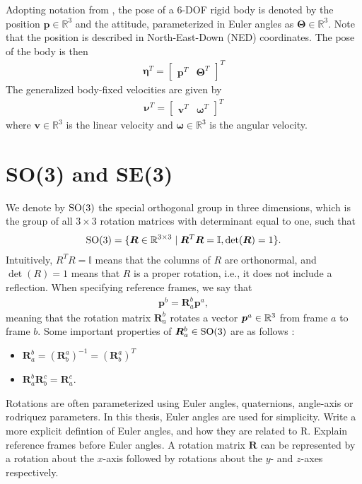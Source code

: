 Adopting notation from \cite{fossen2021}, the pose of a 6-DOF rigid body
is denoted by the position $\bm{p} \in \mathbb{R}^3$ and the attitude, parameterized
in Euler angles as $\bm{\Theta} \in \mathbb{R}^3$. Note that the position is
described in North-East-Down (NED) coordinates. The pose of the body is then
\begin{align}
    \bm{\eta}^T = \begin{bmatrix} \bm{p}^T & \bm{\Theta}^T \end{bmatrix}^T
\end{align}
The generalized body-fixed velocities are given by
\begin{align}
    \bm{\nu}^T = \begin{bmatrix} \bm{v}^T & \bm{\omega}^T \end{bmatrix}^T
\end{align}
where $\bm{v} \in \mathbb{R}^3$ is the linear velocity and $\bm{\omega} \in \mathbb{R}^3$
is the angular velocity.

\section{SO(3) and SE(3)}
\label{sec:bp:so3_se3}

We denote by $\operatorname{SO}(3)$ the special orthogonal group in three dimensions, which is
the group of all $3 \times 3$ rotation matrices with determinant equal to one,
such that
\begin{align}
    \operatorname{SO}(3) = \{ \bm{R} \in \mathbb{R}^{3 \times 3} \mid \bm{R}^T \bm{R} = \mathbb{I}, \det(\bm{R}) = 1 \}.
\end{align}
Intuitively, $R^T R = \mathbb{I}$ means that the columns of $R$ are orthonormal,
and $\det(R) = 1$ means that $R$ is a proper rotation, i.e., it does not include
a reflection. When specifying reference frames, we say that
\begin{align}
    \bm{p}^b = \bm{R}_{a}^b \bm{p}^a,
\end{align}
meaning that the rotation matrix $\bm{R}_{a}^b$ rotates a vector
$\bm{p}^a\in\mathbb{R}^3$ from frame $a$ to frame $b$. Some important properties
of $\bm{R}_a^b \in \operatorname{SO}(3)$ are as follows \cite{modsim}:
\begin{itemize}
\item $\bm{R}_a^b = (\bm{R}_b^a)^{-1} = (\bm{R}_b^a)^T$
\item $\bm{R}_a^b \bm{R}_b^c = \bm{R}_a^c$.
\end{itemize}
Rotations are often parameterized using Euler angles, quaternions, angle-axis or
rodriquez parameters. In this thesis, Euler angles are used for simplicity. 
{\color{red}Write a more explicit defintion of Euler angles, and how they are related to R.
Explain reference frames before Euler angles.}
A rotation matrix $\bm{R}$ can be represented by a rotation about the $x$-axis followed
by rotations about the $y$- and $z$-axes respectively.

